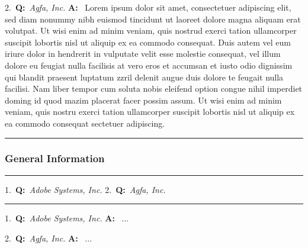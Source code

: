 \documentclass[pdftex,english,a4paper,10pt]{article}
\begin{document}
\vspace{1em}
\noindent{}2.~\textbf{Q:}~\textit{Agfa, Inc.}
\newline
\noindent\textbf{A:}~
Lorem ipsum dolor sit amet, consectetuer adipiscing elit, sed diam nonummy nibh euismod tincidunt ut laoreet dolore magna aliquam erat volutpat. Ut wisi enim ad minim veniam, quis nostrud exerci tation ullamcorper suscipit lobortis nisl ut aliquip ex ea commodo consequat. Duis autem vel eum iriure dolor in hendrerit in vulputate velit esse molestie consequat, vel illum dolore eu feugiat nulla facilisis at vero eros et accumsan et iusto odio dignissim qui blandit praesent luptatum zzril delenit augue duis dolore te feugait nulla facilisi. Nam liber tempor cum soluta nobis eleifend option congue nihil imperdiet doming id quod mazim placerat facer possim assum. Ut wisi enim ad minim veniam, quis nostru exerci tation ullamcorper suscipit lobortis nisl ut aliquip ex ea commodo consequat sectetuer adipiscing.


\vspace{1em}
\noindent\begin{minipage}{\linewidth}
\vspace{0.25em}\hrule\vspace{0.25em}
\subsubsection*{General Information}\label{id2735174}
\hrule\vspace{0.25em}
\end{minipage}
\noindent{}1.~\textbf{Q:}~\textit{Adobe Systems, Inc.}
\newline
\noindent{}2.~\textbf{Q:}~\textit{Agfa, Inc.}
\vspace{0.25em}\hrule
\vspace{1em}
\noindent{}1.~\textbf{Q:}~\textit{Adobe Systems, Inc.}
\newline
\noindent\textbf{A:}~
...


\vspace{1em}
\noindent{}2.~\textbf{Q:}~\textit{Agfa, Inc.}
\newline
\noindent\textbf{A:}~
...


\vspace{1em}
\end{document}
